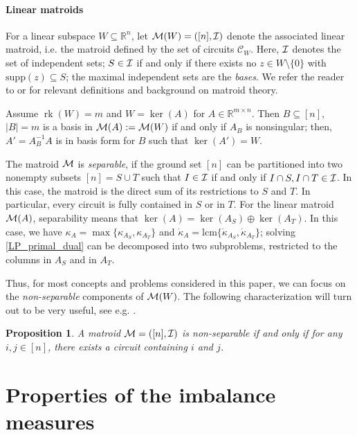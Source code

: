 \documentclass[11pt, a4paper]{article}
\newcommand{\circuits}{\mathcal{C}}
\newcommand{\supp}{\mathrm{supp}}
\newcommand{\1}{\mathbbm{1}}
\newcommand{\rk}{\operatorname{rk}}
\newcommand{\kd}{{\dot{\kappa}}}
\newcommand{\lcm}{\mathrm{lcm}}
\newtheorem{prop}[theorem]{Proposition}
\theoremstyle{case}
\newcommand{\R}{\mathbb{R}}
\begin{document}
\paragraph{Linear matroids}
For a linear subspace $W\subseteq\R^n$, let ${\cal M}(W)=([n],{\cal I})$ denote the associated linear matroid, i.e. the matroid defined by the set of circuits $\circuits_W$. Here, ${\cal I}$ denotes the set of independent sets; $S\in {\cal I}$ if and only if there exists no $z\in W\setminus \{0\}$ with $\supp(z)\subseteq S$; the maximal independent sets are the \emph{bases}.
We refer
the reader to \cite[Chapter 39]{schrijver} or \cite[Chapter
5]{frankbook} for relevant definitions and background on matroid theory.

 Assume $\rk(W)=m$ and $W=\ker(A)$ for $A\in\R^{m\times n}$. Then $B\subseteq [n]$, $|B|=m$ is a basis in ${\cal M}(A):={\cal M}(W)$ if and only if $A_B$ is nonsingular; then, $A'=A_B^{-1}A$ is in basis form for $B$ 
such that $\ker(A')=W$. 

The matroid $\cal M$ is \emph{separable}, if the ground set $[n]$ can be
partitioned into two nonempty subsets $[n]=S\cup T$ such that $I\in
{\cal I}$ if and only if $I\cap S,I\cap T\in {\cal I}$. In this case, the matroid is the direct sum of its
restrictions to $S$ and $T$. In particular, every circuit is fully
contained in $S$ or in $T$. For the linear matroid ${\cal M}(A)$, separability means that $\ker(A)=\ker(A_S)\oplus \ker(A_T)$. 
 In this case, we have $\kappa_A=\max\{\kappa_{A_S},\kappa_{A_T}\}$ and  $\kd_A=\lcm\{\kd_{A_S},\kd_{A_T}\}$; 
solving \ref{LP_primal_dual} can be decomposed into two
subproblems, restricted to the columns in $A_S$ and in $A_T$.

Thus, for most concepts and problems considered in this paper, we can focus on the \emph{non-separable} components of ${\cal M}(W)$.
The following characterization will turn out to be very useful, see e.g.
\cite[Theorem 5.2.5]{frankbook}.

\begin{prop}\label{prop:conn}
A matroid ${\cal M}=([n],{\cal I})$ is non-separable if and only if for 
any $i,j\in [n]$, there exists a circuit containing $i$ and $j$.
\end{prop} 
\section{Properties of the imbalance measures}\label{sec:basic}
\end{document}
